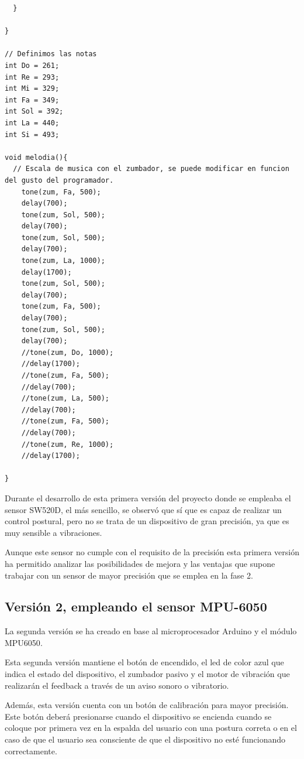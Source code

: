 \begin{lstlisting}
  }

}

// Definimos las notas
int Do = 261;
int Re = 293;
int Mi = 329;
int Fa = 349;
int Sol = 392;
int La = 440;
int Si = 493;

void melodia(){
  // Escala de musica con el zumbador, se puede modificar en funcion del gusto del programador.
    tone(zum, Fa, 500);
    delay(700);
    tone(zum, Sol, 500);
    delay(700);
    tone(zum, Sol, 500);
    delay(700);
    tone(zum, La, 1000);
    delay(1700);
    tone(zum, Sol, 500);
    delay(700);
    tone(zum, Fa, 500);
    delay(700);
    tone(zum, Sol, 500);
    delay(700);
    //tone(zum, Do, 1000);
    //delay(1700);
    //tone(zum, Fa, 500);
    //delay(700);
    //tone(zum, La, 500);
    //delay(700);
    //tone(zum, Fa, 500);
    //delay(700);
    //tone(zum, Re, 1000);
    //delay(1700);
    
}

\end{lstlisting}

Durante el desarrollo de esta primera versión del proyecto donde se empleaba el sensor SW520D\cite{SW520D_1}, el más sencillo, se observó que sí que es capaz de realizar un control postural, pero no se trata de un dispositivo de gran precisión, ya que es muy sensible a vibraciones.

Aunque este sensor no cumple con el requisito de la precisión esta primera versión ha permitido analizar las posibilidades de mejora y las ventajas que supone trabajar con un sensor de mayor precisión que se emplea en la fase 2.


\subsection{Versión 2, empleando el sensor MPU-6050}

La segunda versión se ha creado  en base al microprocesador Arduino\cite{Arduino1} y el módulo MPU6050\cite{MPU6050_1,MPU6050_2}.

Esta segunda versión mantiene el botón de encendido, el led de color azul que indica el estado del dispositivo, el zumbador pasivo y el motor de vibración que realizarán el feedback a través de un aviso sonoro o vibratorio.

Además, esta versión cuenta con un botón de calibración para mayor precisión. Este botón deberá presionarse cuando el dispositivo se encienda cuando se coloque por primera vez en la espalda del usuario con una postura correta o en el caso de que el usuario sea consciente de que el dispositivo no esté funcionando correctamente.  

